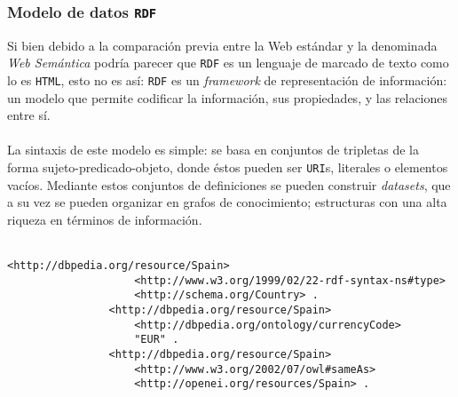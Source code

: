         \subsubsection{Modelo de datos \texttt{RDF}} \label{subsubsec:RDF}
            Si bien debido a la comparación previa entre la Web estándar y la denominada \textit{Web Semántica} podría parecer que \texttt{RDF} es un lenguaje de marcado de texto como lo es \texttt{HTML}, esto no es así: \texttt{RDF} es un \textit{framework} de representación de información: un modelo que permite codificar la información, sus propiedades, y las relaciones entre sí.
            \\ \\
            La sintaxis de este modelo es simple: se basa en conjuntos de tripletas de la forma sujeto-predicado-objeto, donde éstos pueden ser \texttt{URI}s, literales o elementos vacíos. Mediante estos conjuntos de definiciones se pueden construir \textit{datasets}, que a su vez se pueden organizar en grafos de conocimiento; estructuras con una alta riqueza en términos de información.
            \\ \\
            
            \begin{lstlisting}[language=lXML2,gobble=14]
                <http://dbpedia.org/resource/Spain>
                    <http://www.w3.org/1999/02/22-rdf-syntax-ns#type>	
                    <http://schema.org/Country> .
                <http://dbpedia.org/resource/Spain>
                    <http://dbpedia.org/ontology/currencyCode>
                    "EUR" .
                <http://dbpedia.org/resource/Spain>
                    <http://www.w3.org/2002/07/owl#sameAs>
                    <http://openei.org/resources/Spain> .
            \end{lstlisting}
            \label{fig:triplets}
            
            \vspace{0.7cm}
            
